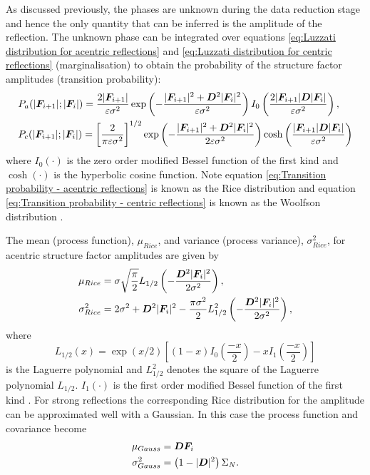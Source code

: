 As discussed previously, the phases are unknown during the data reduction stage and hence the only quantity that can be inferred is the amplitude of the reflection.
The unknown phase can be integrated over equations \ref{eq:Luzzati distribution for acentric reflections} and \ref{eq:Luzzati distribution for centric reflections} (marginalisation) to obtain the probability of the structure factor amplitudes (transition probability):
\begin{align}
    &P_a(|\boldsymbol{F}_{i+1}| ; |\boldsymbol{F}_i|) = \frac{2|\boldsymbol{F}_{i+1}|}{\varepsilon \sigma^2} \exp \left(-\frac{|\boldsymbol{F}_{i+1}|^2 + \boldsymbol{D}^2|\boldsymbol{F}_{i}|^2}{\varepsilon \sigma^2}\right)I_0 \left(\frac{2|\boldsymbol{F}_{i+1}|\boldsymbol{D}|\boldsymbol{F}_{i}|}{\varepsilon \sigma^2}\right), \label{eq:Transition probability - acentric reflections} \\
    &P_c(|\boldsymbol{F}_{i+1}| ; |\boldsymbol{F}_i|) = \left[\frac{2}{\pi \varepsilon \sigma^2}\right]^{1/2} \exp \left(-\frac{|\boldsymbol{F}_{i+1}|^2 + \boldsymbol{D}^2|\boldsymbol{F}_{i}|^2}{2\varepsilon \sigma^2}\right) \cosh \left(\frac{|\boldsymbol{F}_{i+1}|\boldsymbol{D}|\boldsymbol{F}_{i}|}{\varepsilon \sigma^2}\right) \label{eq:Transition probability - centric reflections}
\end{align}
where $I_0(\cdot)$ is the zero order modified Bessel function of the first kind and $\cosh(\cdot)$ is the hyperbolic cosine function.
Note equation \ref{eq:Transition probability - acentric reflections} is known as the Rice distribution and equation \ref{eq:Transition probability - centric reflections} is known as the Woolfson distribution \cite{mccoy2004liking}.

The mean (process function), $\mu_{Rice}$, and variance (process variance), $\sigma_{Rice}^2$, for acentric structure factor amplitudes are given by
\begin{align}
    \mu_{Rice} &= \sigma \sqrt{\frac{\pi}{2}} L_{1/2} \left(-\frac{\boldsymbol{D}^2|\boldsymbol{F}_i|^2}{2\sigma^2}\right), \label{eq:Process function - mean of rice distribution}\\
    \sigma_{Rice}^2 &= 2\sigma^2 + \boldsymbol{D}^2|\boldsymbol{F}_i|^2 - \frac{\pi \sigma^2}{2} L_{1/2}^2 \left(-\frac{\boldsymbol{D}^2|\boldsymbol{F}_i|^2}{2\sigma^2}\right), \label{eq:Process covariance - variance of rice distribution}
\end{align}
where
\begin{equation}
    L_{1/2}(x) = \exp \left( x/2 \right) \left[ (1-x) I_0 \left( \frac{-x}{2} \right) - xI_1 \left( \frac{-x}{2} \right) \right] \label{eq:Laguerre polynomial}
\end{equation}
is the Laguerre polynomial and $ L_{1/2}^2 $ denotes the square of the Laguerre polynomial $ L_{1/2} $. $I_1(\cdot)$ is the first order modified Bessel function of the first kind \cite{den2014data}.
For strong reflections the corresponding Rice distribution for the amplitude can be approximated well with a Gaussian.
In this case the process function and covariance become
\begin{align}
    \mu_{Gauss} &= \boldsymbol{D}\boldsymbol{F}_i \label{eq:Process function - mean of Gaussian distribution}\\
    \sigma_{Gauss}^2 &= \left(1 - |\boldsymbol{D}|^2 \right)\Sigma_N. \label{eq:Process covariance - variance of Gaussian distribution}
\end{align}

